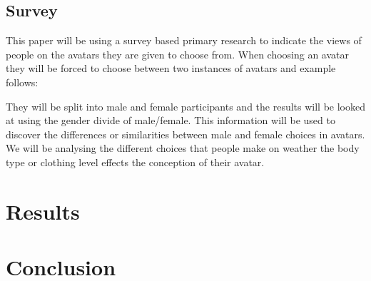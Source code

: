 \documentclass{scrartcl}
\begin{document}
\subsection{Survey}
This paper will be using a survey based primary research to indicate the views of people on the avatars they are given to choose from. When choosing an avatar they will be forced to choose between two instances of avatars and example follows:

They will be split into male and female participants and the results will be looked at using the gender divide of male/female. This information will be used to discover the differences or similarities between male and female choices in avatars. We will be analysing the different choices that people make on weather the body type or clothing level effects the conception of their avatar.

\section{Results}

\section{Conclusion}




\end{document}
